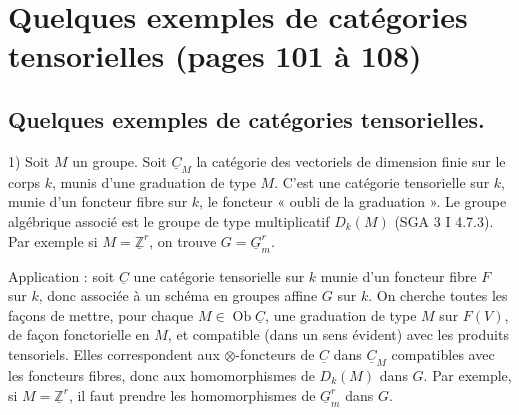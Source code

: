 \documentclass[11pt,a4paper]{article}
\begin{document}
\section*{Quelques exemples de catégories tensorielles (pages 101 à 108)}



\subsection*{Quelques exemples de catégories tensorielles.}

1) Soit $M$ un groupe. Soit $\underline{C}_{M}$ la catégorie des vectoriels de
dimension finie sur le corps $k$, munis d'une graduation de type $M$. C'est
une catégorie tensorielle sur $k$, munie d'un foncteur fibre sur $k$, le
foncteur « oubli de la graduation ». Le groupe algébrique associé est le
groupe de type multiplicatif $D_{k}(M)$ (SGA 3 I 4.7.3). Par exemple si
$M = \underline{\mathbb{Z}}^{r}$, on trouve $G = \underline{G}_{m}^{r}$.

Application : soit $\underline{C}$ une catégorie tensorielle sur $k$ munie
d'un foncteur fibre $F$ sur $k$, donc associée à un schéma en groupes affine
$G$ sur $k$. On cherche toutes les façons de mettre, pour chaque
$M \in \operatorname{Ob} \underline{C}$, une graduation de type $M$ sur
$F(V)$, de façon fonctorielle en $M$, et compatible (dans un sens évident)
avec les produits tensoriels.
Elles correspondent aux $\otimes$-foncteurs de $\underline{C}$ dans
$\underline{C}_{M}$ compatibles avec les foncteurs fibres, donc aux
homomorphismes de $D_{k}(M)$ dans $G$. Par exemple, si
$M = \underline{\mathbb{Z}}^{r}$, il faut prendre les homomorphismes de
$\underline{G}_{m}^{r}$ dans $G$.
\end{document}
